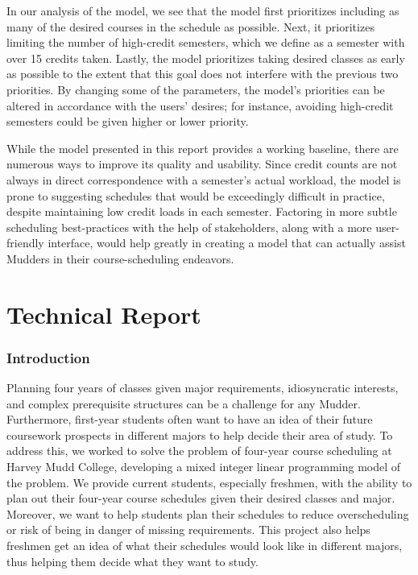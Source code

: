\documentclass[12pt]{article}
\begin{document}
In our analysis of the model, we see that the model first prioritizes including as many of the desired courses in the schedule as possible. Next, it prioritizes limiting the number of high-credit semesters, which we define as a semester with over 15 credits taken. Lastly, the model prioritizes taking desired classes as early as possible to the extent that this goal does not interfere with the previous two priorities. By changing some of the parameters, the model's priorities can be altered in accordance with the users' desires; for instance, avoiding high-credit semesters could be given higher or lower priority.

While the model presented in this report provides a working baseline, there are numerous ways to improve its quality and usability. Since credit counts are not always in direct correspondence with a semester's actual workload, the model is prone to suggesting schedules that would be exceedingly difficult in practice, despite maintaining low credit loads in each semester. Factoring in more subtle scheduling best-practices with the help of stakeholders, along with a more user-friendly interface, would help greatly in creating a model that can actually assist Mudders in their course-scheduling endeavors.

\clearpage

\part{Technical Report}

\section{Introduction}

Planning four years of classes given major requirements, idiosyncratic interests, and complex prerequisite structures can be a challenge for any Mudder.
Furthermore, first-year students often want to have an idea of their future coursework prospects in different majors to help decide their area of study.
To address this, we worked to solve the problem of four-year course scheduling at Harvey Mudd College, developing a mixed integer linear programming model of the problem.
We provide current students, especially freshmen, with the ability to plan out their four-year course schedules given their desired classes and major.
Moreover, we want to help students plan their schedules to reduce overscheduling or risk of being in danger of missing requirements.
This project also helps freshmen get an idea of what their schedules would look like in different majors, thus helping them decide what they want to study.
\end{document}
